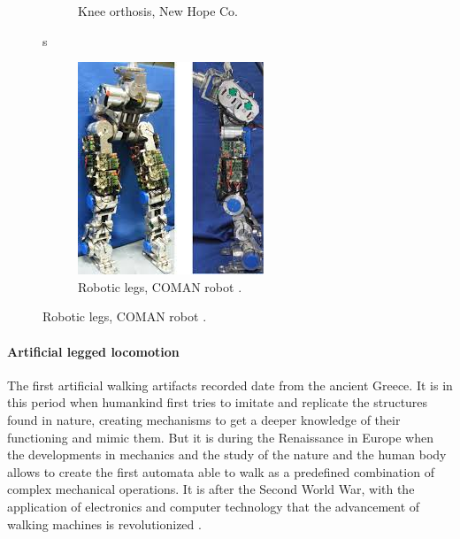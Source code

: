 \begin{figure}[htb]
\begin{subfigure}[b]{0.31\textwidth}
        \caption{Knee orthosis, New Hope Co.}
        \label{fig:orthotic_leg}
    \end{subfigure}s
    \centering
    \begin{subfigure}[b]{0.31\textwidth}
        \includegraphics[width=\textwidth]{figures/robotic_leg.jpg}
        \caption{Robotic legs, COMAN robot \cite{coman}.}
        \label{fig:robotic_leg}
    \end{subfigure}
\end{figure}

\paragraph{Artificial legged locomotion} %
\label{par:humanoid_robots}  
The first artificial walking artifacts recorded date from the ancient Greece.
It is in this period when humankind first tries to imitate and replicate the structures found in nature, creating mechanisms to get a deeper knowledge of their functioning and mimic them.
But it is during the Renaissance in Europe when the developments in mechanics and the study of the nature and the human body allows to create the first automata able to walk as a predefined combination of complex mechanical operations.
It is after the Second World War, with the application of electronics and computer technology that the advancement of walking machines is revolutionized \cite{legged_mot_history1}.


